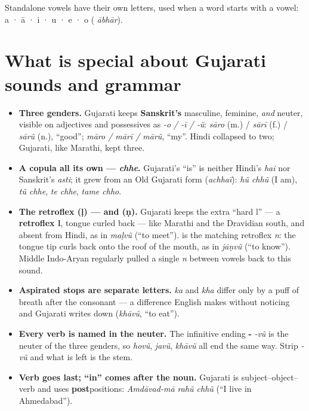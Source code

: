 Standalone vowels have their own letters, used when a word starts with a vowel:  a ·  ā ·  i ·  u ·  e ·  o ( \emph{ābhār}).

\section*{What is special about Gujarati sounds and grammar}

\begin{itemize}
\raggedright
\setlength{\itemsep}{0.35em}
  \item \textbf{Three genders.} Gujarati keeps \textbf{Sanskrit's} masculine, feminine, \emph{and} neuter, visible on adjectives and possessives as \emph{-o / -ī / -ũ}: \emph{sāro} (m.) / \emph{sārī} (f.) / \emph{sārũ} (n.), \textquotedblleft{}good\textquotedblright{}; \emph{māro / mārī / mārũ}, \textquotedblleft{}my\textquotedblright{}. Hindi collapsed to two; Gujarati, like Marathi, kept three.
  \item \textbf{A copula all its own — \emph{chhe}.} Gujarati's \textquotedblleft{}is\textquotedblright{} is neither Hindi's \emph{hai} nor Sanskrit's \emph{asti}; it grew from an Old Gujarati form (\emph{achhaï}): \emph{hũ chhũ} (I am), \emph{tũ chhe}, \emph{te chhe}, \emph{tame chho}.
  \item \textbf{The retroflex  (ḷ) — and  (ṇ).} Gujarati keeps the extra \textquotedblleft{}hard l\textquotedblright{} — a \textbf{retroflex l}, tongue curled back — like Marathi and the Dravidian south, and absent from Hindi, as in \emph{maḷvũ} (\textquotedblleft{}to meet\textquotedblright{}). \textbf{} is the matching retroflex \emph{n}: the tongue tip curls back onto the roof of the mouth, as in \emph{jāṇvũ} (\textquotedblleft{}to know\textquotedblright{}). Middle Indo-Aryan regularly pulled a single \emph{n} between vowels back to this sound.
  \item \textbf{Aspirated stops are separate letters.} \textbf{} \emph{ka} and \textbf{} \emph{kha} differ only by a puff of breath after the consonant — a difference English makes without noticing and Gujarati writes down (\emph{khāvũ}, \textquotedblleft{}to eat\textquotedblright{}).
  \item \textbf{Every verb is named in the neuter.} The infinitive ending \textbf{-} \emph{-vũ} is the neuter of the three genders, so \emph{hovũ}, \emph{javũ}, \emph{khāvũ} all end the same way. Strip \emph{-vũ} and what is left is the stem.
  \item \textbf{Verb goes last; \textquotedblleft{}in\textquotedblright{} comes after the noun.} Gujarati is subject–object–verb and uses \textbf{post}positions: \emph{Amdāvad-mā rahũ chhũ} (\textquotedblleft{}I live in Ahmedabad\textquotedblright{}).

\end{itemize}
